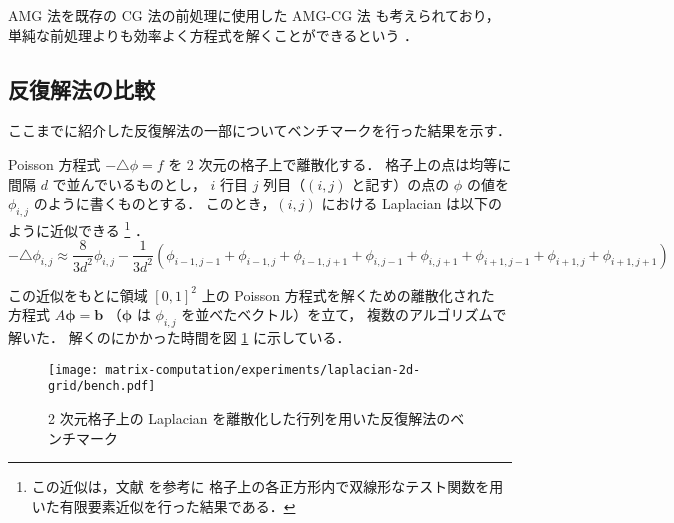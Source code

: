 AMG 法を既存の CG 法の前処理に使用した AMG-CG 法
も考えられており，
単純な前処理よりも効率よく方程式を解くことができるという
\cite{Wolters2002}．

\clearpage

\subsection{反復解法の比較}

ここまでに紹介した反復解法の一部についてベンチマークを行った結果を示す．

Poisson 方程式 $-\triangle\phi = f$ を 2 次元の格子上で離散化する．
格子上の点は均等に間隔 $d$ で並んでいるものとし，
$i$ 行目 $j$ 列目（$(i, j)$ と記す）の点の $\phi$ の値を $\phi_{i,j}$ のように書くものとする．
このとき，$(i, j)$ における Laplacian は以下のように近似できる
\footnote{この近似は，文献 \cite{Knabner2003} を参考に%
    格子上の各正方形内で双線形なテスト関数を用いた有限要素近似を行った結果である．%
    }
．
\begin{equation}
    -\triangle \phi_{i,j} \approx
    \frac{8}{3d^2} \phi_{i,j} - \frac{1}{3d^2} \left(
    \phi_{i-1,j-1} + \phi_{i-1,j} + \phi_{i-1,j+1}
    + \phi_{i,j-1} + \phi_{i,j+1}
    + \phi_{i+1,j-1} + \phi_{i+1,j} + \phi_{i+1,j+1}
    \right)
\end{equation}

この近似をもとに領域 $[0, 1]^2$ 上の Poisson 方程式を解くための離散化された
方程式 $A \bm{\phi} = \bm{b}$ （$\bm{\phi}$ は $\phi_{i,j}$ を並べたベクトル）を立て，
複数のアルゴリズムで解いた．
解くのにかかった時間を図 \ref{fig:matrix-computation_bench-laplacian-2d-grid} に示している．


\begin{figure}[tp]
    \centering
    \texttt{[image: matrix-computation/experiments/laplacian-2d-grid/bench.pdf]}
    \caption{2 次元格子上の Laplacian を離散化した行列を用いた反復解法のベンチマーク}
    \label{fig:matrix-computation_bench-laplacian-2d-grid}
\end{figure}
